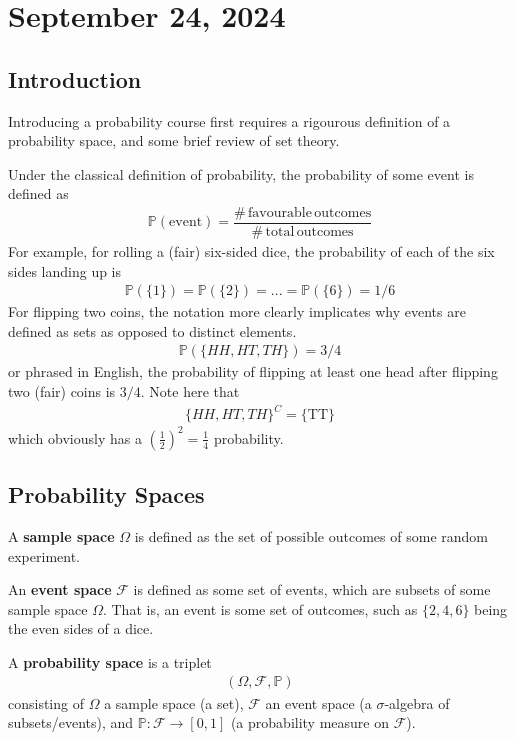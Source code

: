 \section{September 24, 2024}
\subsection{Introduction}
Introducing a probability course first requires a rigourous definition of a probability space, and some brief review of set theory.

\begin{proposition}
    Under the classical definition of probability, the probability of some event is defined as
    \begin{align}
        \mathbb{P}(\mathrm{event}) = \dfrac{\#\,\mathrm{favourable\,outcomes}}{\#\,\mathrm{total\,outcomes}}
    \end{align}
    For example, for rolling a (fair) six-sided dice, the probability of each of the six sides landing up is 
    \begin{align}
        \mathbb{P}(\{1\}) = \mathbb{P}(\{2\}) = ... = \mathbb{P}(\{6\}) = 1/6
    \end{align}
    For flipping two coins, the notation more clearly implicates why events are defined as sets as opposed to distinct elements.
    \begin{align}
        \mathbb{P}(\{ HH, HT, TH \}) = 3/4
    \end{align}
    or phrased in English, the probability of flipping at least one head after flipping two (fair) coins is $3/4$. Note here that
    \begin{align}
        \{ HH, HT, TH \}^C = \{ \mathrm{TT} \} 
    \end{align}
    which obviously has a $\left( \frac{1}{2} \right)^2 = \frac{1}{4}$ probability.
\end{proposition}

\subsection{Probability Spaces}
\begin{definition}
    A \textbf{sample space} $\Omega$ is defined as the set of possible outcomes of some random experiment.
\end{definition}
\begin{definition}
    An \textbf{event space} $\mathcal{F}$ is defined as some set of events, which are subsets of some sample space $\Omega$. That is, an event is some set of outcomes, such as $\{ 2, 4, 6 \}$ being the even sides of a dice.
\end{definition}
\begin{definition}
    A \textbf{probability space} is a triplet
    \begin{align}
        \left( \Omega, \mathcal{F}, \mathbb{P} \right)
    \end{align}
    consisting of $\Omega$ a sample space (a set), $\mathcal{F}$ an event space (a $\sigma$-algebra of subsets/events), and $\mathbb{P}: \mathcal{F} \to [0,1]$ (a probability measure on $\mathcal{F}$).
\end{definition}

